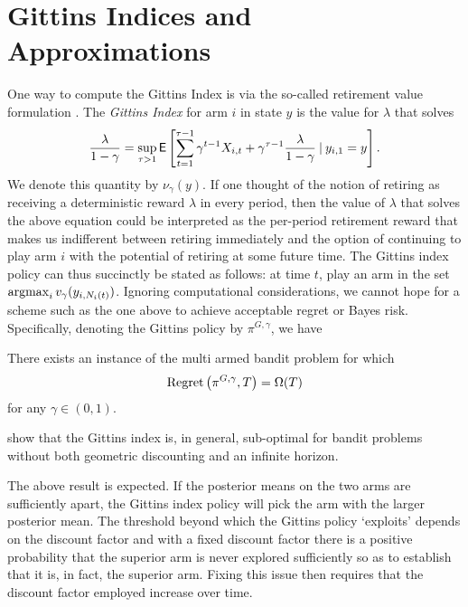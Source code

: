 \section{Gittins Indices and Approximations} \label{sec:gittins_and_approx}
One way to compute the Gittins Index is via the so-called retirement value formulation \cite{whittle1980multi}. The \emph{Gittins Index} for arm $i$ in state $y$ is the value for $\lambda$ that solves
\begin{equation} \label{eqn:gittins_index}
\frac{\lambda}{1-\gamma} = \sup_{\tau > 1}\mathsf{E}\left[\sum_{t=1}^{\tau-1} \gamma^{t-1} X_{i,t} + \gamma^{\tau-1} \frac{\lambda}{1-\gamma}
	\:\vert\: y_{i,1} = y
\right].
\end{equation}
We denote this quantity by $\nu_\gamma(y)$. If one thought of the notion of retiring as receiving a deterministic reward $\lambda$ in every period, then the value of $\lambda$ that solves the above equation could be interpreted as the per-period retirement reward that makes us indifferent between retiring immediately and the option of continuing to play arm $i$ with the potential of retiring at some future time. The Gittins index policy can thus succinctly be stated as follows: at time $t$, play an arm in the set $\operatorname*{\mathrm{argmax}}_{i} v_\gamma(y_{i,N_i(t)})$. 
Ignoring computational considerations, we cannot hope for a scheme such as the one above to achieve acceptable regret or Bayes risk. Specifically, denoting the Gittins policy by $\pi^{G,\gamma}$, we have 

\begin{lemma}
	There exists an instance of the multi armed bandit problem for which 
	\[
	{\rm Regret}\left(
	\pi^{G,\gamma},T
	\right)
	= 
	\Omega(T)
	\]
	for any $\gamma \in (0,1)$.
\end{lemma}
\begin{myproof}[Proof.]
	\cite{berry1985bandit} show that the Gittins index is, in general, sub-optimal for bandit problems without both geometric discounting and an infinite horizon.
\end{myproof}
The above result is expected. If the posterior means on the two arms are sufficiently apart, the Gittins index policy will pick the arm with the larger posterior mean. The threshold beyond which the Gittins policy `exploits' depends on the discount factor and with a fixed discount factor there is a positive probability that the superior arm is never explored sufficiently so as to establish that it is, in fact, the superior arm. Fixing this issue then requires that the discount factor employed increase over time.

